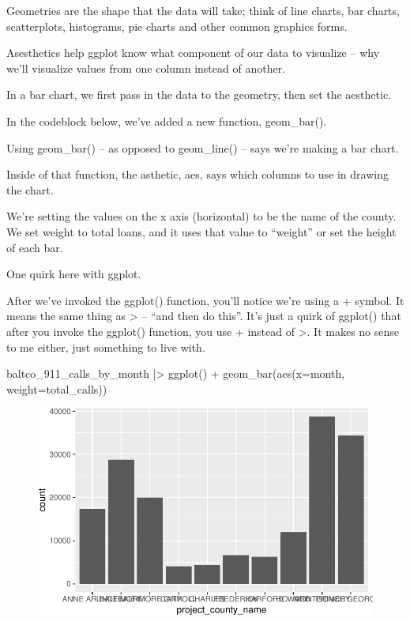 \documentclass[
  letterpaper,
  DIV=11,
  numbers=noendperiod]{scrreprt}
\newenvironment{Shaded}{\begin{snugshade}}{\end{snugshade}}
\newcommand{\AttributeTok}[1]{\textcolor[rgb]{0.40,0.45,0.13}{#1}}
\newcommand{\FunctionTok}[1]{\textcolor[rgb]{0.28,0.35,0.67}{#1}}
\newcommand{\NormalTok}[1]{\textcolor[rgb]{0.00,0.23,0.31}{#1}}
\newcommand{\SpecialCharTok}[1]{\textcolor[rgb]{0.37,0.37,0.37}{#1}}
\begin{document}
Geometries are the shape that the data will take; think of line charts,
bar charts, scatterplots, histograms, pie charts and other common
graphics forms.

Asesthetics help ggplot know what component of our data to visualize --
why we'll visualize values from one column instead of another.

In a bar chart, we first pass in the data to the geometry, then set the
aesthetic.

In the codeblock below, we've added a new function, geom\_bar().

Using geom\_bar() -- as opposed to geom\_line() -- says we're making a
bar chart.

Inside of that function, the asthetic, aes, says which columns to use in
drawing the chart.

We're setting the values on the x axis (horizontal) to be the name of
the county. We set weight to total loans, and it uses that value to
``weight'' or set the height of each bar.

One quirk here with ggplot.

After we've invoked the ggplot() function, you'll notice we're using a +
symbol. It means the same thing as \textbar\textgreater{} -- ``and then
do this''. It's just a quirk of ggplot() that after you invoke the
ggplot() function, you use + instead of \textbar\textgreater. It makes
no sense to me either, just something to live with.

\begin{Shaded}
\begin{Highlighting}[]
\NormalTok{baltco\_911\_calls\_by\_month }\SpecialCharTok{|\textgreater{}}
  \FunctionTok{ggplot}\NormalTok{() }\SpecialCharTok{+}
  \FunctionTok{geom\_bar}\NormalTok{(}\FunctionTok{aes}\NormalTok{(}\AttributeTok{x=}\NormalTok{month, }\AttributeTok{weight=}\NormalTok{total\_calls))}
\end{Highlighting}
\end{Shaded}

\begin{figure}[H]

{\centering \includegraphics{./visualizing-for-reporting_files/figure-pdf/unnamed-chunk-5-1.pdf}

}

\end{figure}
\end{document}
